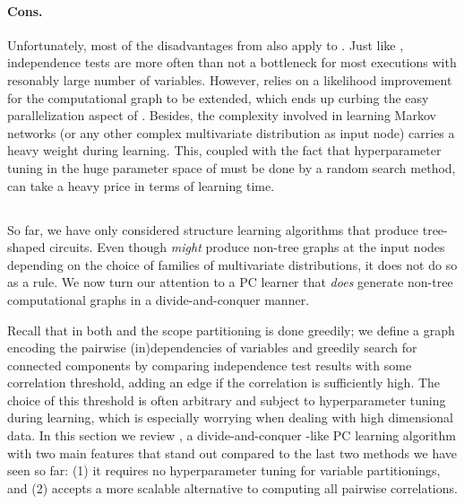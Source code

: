 \paragraph{Cons.} Unfortunately, most of the disadvantages from  also apply to
. Just like , independence tests are more often than not a
bottleneck for most executions with resonably large number of variables. However, 
relies on a likelihood improvement for the computational graph to be extended, which ends up
curbing the easy parallelization aspect of . Besides, the complexity involved in
learning Markov networks (or any other complex multivariate distribution as input node) carries a
heavy weight during learning. This, coupled with the fact that hyperparameter tuning in the huge
parameter space of  must be done by a random search method, can take a heavy price
in terms of learning time.

\subsection{}
\label{sec:prometheus}

So far, we have only considered structure learning algorithms that produce tree-shaped circuits.
Even though  \emph{might} produce non-tree graphs at the input nodes depending on
the choice of families of multivariate distributions, it does not do so as a rule. We now turn our
attention to a PC learner that \emph{does} generate non-tree computational graphs in a
divide-and-conquer manner.

Recall that in both  and  the scope partitioning is done
greedily; we define a graph encoding the pairwise (in)dependencies of variables and greedily search
for connected components by comparing independence test results with some correlation threshold,
adding an edge if the correlation is sufficiently high. The choice of this threshold is often
arbitrary and subject to hyperparameter tuning during learning, which is especially worrying when
dealing with high dimensional data. In this section we review 
\citep{jaini18a}, a divide-and-conquer -like PC learning algorithm with two main
features that stand out compared to the last two methods we have seen so far: (1) it requires no
hyperparameter tuning for variable partitionings, and (2) accepts a more scalable alternative to
computing all pairwise correlations.

